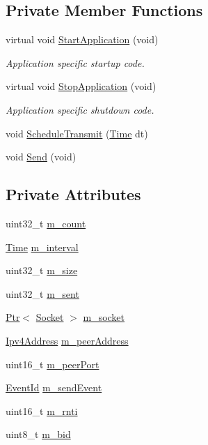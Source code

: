 \subsection*{Private Member Functions}
\begin{DoxyCompactItemize}
\item 
virtual void \hyperlink{classEpsBearerTagUdpClient_aa750a1c9d67603e34e30cbbdde365380}{Start\+Application} (void)
\begin{DoxyCompactList}\small\item\em Application specific startup code. \end{DoxyCompactList}\item 
virtual void \hyperlink{classEpsBearerTagUdpClient_a541823d402380299cb112b39c11547b6}{Stop\+Application} (void)
\begin{DoxyCompactList}\small\item\em Application specific shutdown code. \end{DoxyCompactList}\item 
void \hyperlink{classEpsBearerTagUdpClient_a6359672b43168ea61d97b60099862731}{Schedule\+Transmit} (\hyperlink{classns3_1_1Time}{Time} dt)
\item 
void \hyperlink{classEpsBearerTagUdpClient_a174ab1c14216adab1d1d231746d1a005}{Send} (void)
\end{DoxyCompactItemize}
\subsection*{Private Attributes}
\begin{DoxyCompactItemize}
\item 
uint32\+\_\+t \hyperlink{classEpsBearerTagUdpClient_a1dc79f7507b3c34797a8793f0fb83aba}{m\+\_\+count}
\item 
\hyperlink{classns3_1_1Time}{Time} \hyperlink{classEpsBearerTagUdpClient_ae4d0ca67d266f8e1a7684e87a9cf7fec}{m\+\_\+interval}
\item 
uint32\+\_\+t \hyperlink{classEpsBearerTagUdpClient_a80eea46d1ecfcd76eef1cd079e5c4088}{m\+\_\+size}
\item 
uint32\+\_\+t \hyperlink{classEpsBearerTagUdpClient_a441c27a363bc1809826142ec61023975}{m\+\_\+sent}
\item 
\hyperlink{classns3_1_1Ptr}{Ptr}$<$ \hyperlink{classns3_1_1Socket}{Socket} $>$ \hyperlink{classEpsBearerTagUdpClient_a6707bd86336385fc506e8cdeee6f6c9d}{m\+\_\+socket}
\item 
\hyperlink{classns3_1_1Ipv4Address}{Ipv4\+Address} \hyperlink{classEpsBearerTagUdpClient_abed599c67599f9954fb9a4664889717f}{m\+\_\+peer\+Address}
\item 
uint16\+\_\+t \hyperlink{classEpsBearerTagUdpClient_a138e428cd5597ffe5a1935c9788c7961}{m\+\_\+peer\+Port}
\item 
\hyperlink{classns3_1_1EventId}{Event\+Id} \hyperlink{classEpsBearerTagUdpClient_aa9376a3a0f0ba87d9549e51004e94dd0}{m\+\_\+send\+Event}
\item 
uint16\+\_\+t \hyperlink{classEpsBearerTagUdpClient_adb3847e261e45e0a70cd1fd8f8b781cd}{m\+\_\+rnti}
\item 
uint8\+\_\+t \hyperlink{classEpsBearerTagUdpClient_a946052808de58c616b3a640f1be56478}{m\+\_\+bid}
\end{DoxyCompactItemize}
